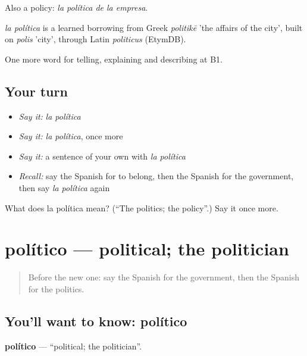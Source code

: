 Also a policy: \emph{la política de la empresa}.

\begin{cousinweb}
\emph{la política} is a learned borrowing from Greek \emph{politikē} 'the affairs of the city', built on \emph{polis} 'city', through Latin \emph{politicus} (EtymDB).
\end{cousinweb}

\begin{grammarlens}[title={What you've built}]
One more word for telling, explaining and describing at B1.
\end{grammarlens}

\subsection*{Your turn}
\begin{itemize}
\raggedright
  \item \emph{Say it:} \emph{la política}
  \item \emph{Say it:} \emph{la política}, once more
  \item \emph{Say it:} a sentence of your own with \emph{la política}
  \item \emph{Recall:} say the Spanish for to belong, then the Spanish for the government, then say \emph{la política} again
\end{itemize}

\begin{tcolorbox}[breakable,colback=teal!4,colframe=teal!35!black,title={Before you move on}]
What does la política mean? (\textquotedblleft{}The politics; the policy\textquotedblright{}.) Say it once more.
\end{tcolorbox}
\section[político]{político — political; the politician}

\label{lesson:ES-C601-politico}



\begin{quote}
Before the new one: say the Spanish for the government, then the Spanish for the politics.
\end{quote}

\subsection*{You'll want to know: político}
\textbf{político} — \textquotedblleft{}political; the politician\textquotedblright{}.

